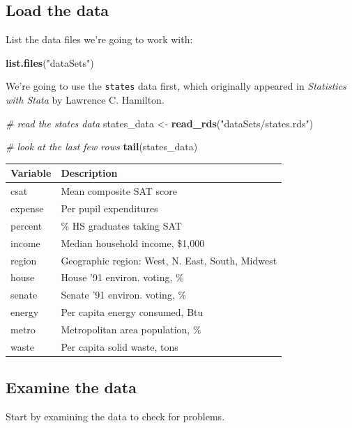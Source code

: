 \documentclass[]{book}
\newenvironment{Shaded}{\begin{snugshade}}{\end{snugshade}}
\newcommand{\CommentTok}[1]{\textcolor[rgb]{0.56,0.35,0.01}{\textit{#1}}}
\newcommand{\KeywordTok}[1]{\textcolor[rgb]{0.13,0.29,0.53}{\textbf{#1}}}
\newcommand{\NormalTok}[1]{#1}
\newcommand{\StringTok}[1]{\textcolor[rgb]{0.31,0.60,0.02}{#1}}
\begin{document}
\hypertarget{load-the-data}{%
\subsection{Load the data}\label{load-the-data}}

List the data files we're going to work with:

\begin{Shaded}
\begin{Highlighting}[]
\KeywordTok{list.files}\NormalTok{(}\StringTok{"dataSets"}\NormalTok{)}
\end{Highlighting}
\end{Shaded}

We're going to use the \texttt{states} data first, which originally appeared in \emph{Statistics with Stata} by Lawrence C. Hamilton.

\begin{Shaded}
\begin{Highlighting}[]
  \CommentTok{# read the states data}
\NormalTok{  states_data <-}\StringTok{ }\KeywordTok{read_rds}\NormalTok{(}\StringTok{"dataSets/states.rds"}\NormalTok{) }

  \CommentTok{# look at the last few rows}
  \KeywordTok{tail}\NormalTok{(states_data)}
\end{Highlighting}
\end{Shaded}

\begin{longtable}[]{@{}ll@{}}
\toprule
Variable & Description\tabularnewline
\midrule
\endhead
csat & Mean composite SAT score\tabularnewline
expense & Per pupil expenditures\tabularnewline
percent & \% HS graduates taking SAT\tabularnewline
income & Median household income, \$1,000\tabularnewline
region & Geographic region: West, N. East, South, Midwest\tabularnewline
house & House '91 environ. voting, \%\tabularnewline
senate & Senate '91 environ. voting, \%\tabularnewline
energy & Per capita energy consumed, Btu\tabularnewline
metro & Metropolitan area population, \%\tabularnewline
waste & Per capita solid waste, tons\tabularnewline
\bottomrule
\end{longtable}

\hypertarget{examine-the-data}{%
\subsection{Examine the data}\label{examine-the-data}}

Start by examining the data to check for problems.
\end{document}
